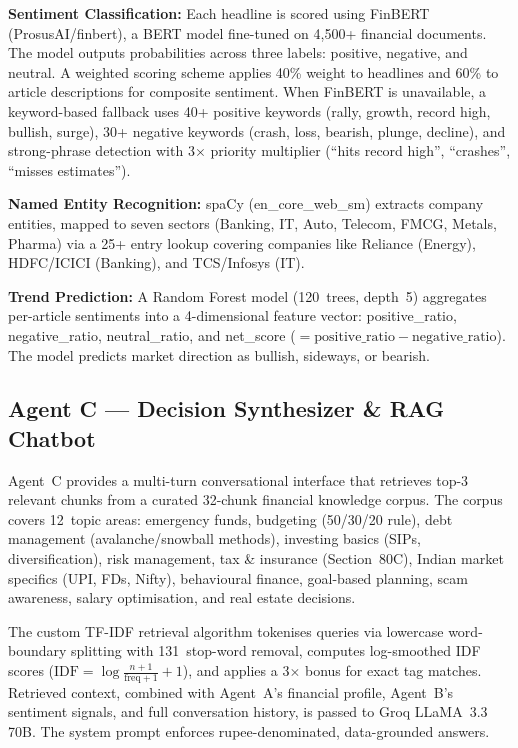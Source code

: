 \documentclass[conference]{IEEEtran}
\begin{document}
\textbf{Sentiment Classification:} Each headline is scored using FinBERT (ProsusAI/finbert), a BERT model fine-tuned on 4,500+ financial documents. The model outputs probabilities across three labels: positive, negative, and neutral. A weighted scoring scheme applies 40\% weight to headlines and 60\% to article descriptions for composite sentiment. When FinBERT is unavailable, a keyword-based fallback uses 40+ positive keywords (rally, growth, record high, bullish, surge), 30+ negative keywords (crash, loss, bearish, plunge, decline), and strong-phrase detection with 3$\times$ priority multiplier (``hits record high'', ``crashes'', ``misses estimates'').

\textbf{Named Entity Recognition:} spaCy (en\_core\_web\_sm) extracts company entities, mapped to seven sectors (Banking, IT, Auto, Telecom, FMCG, Metals, Pharma) via a 25+ entry lookup covering companies like Reliance (Energy), HDFC/ICICI (Banking), and TCS/Infosys (IT).

\textbf{Trend Prediction:} A Random Forest model (120~trees, depth~5) aggregates per-article sentiments into a 4-dimensional feature vector: positive\_ratio, negative\_ratio, neutral\_ratio, and net\_score ($= \text{positive\_ratio} - \text{negative\_ratio}$). The model predicts market direction as bullish, sideways, or bearish.

\subsection{Agent C --- Decision Synthesizer \& RAG Chatbot}

Agent~C provides a multi-turn conversational interface that retrieves top-3 relevant chunks from a curated 32-chunk financial knowledge corpus. The corpus covers 12~topic areas: emergency funds, budgeting (50/30/20 rule), debt management (avalanche/snowball methods), investing basics (SIPs, diversification), risk management, tax \& insurance (Section~80C), Indian market specifics (UPI, FDs, Nifty), behavioural finance, goal-based planning, scam awareness, salary optimisation, and real estate decisions.

The custom TF-IDF retrieval algorithm tokenises queries via lowercase word-boundary splitting with 131~stop-word removal, computes log-smoothed IDF scores ($\text{IDF} = \log\frac{n+1}{\text{freq}+1} + 1$), and applies a 3$\times$ bonus for exact tag matches. Retrieved context, combined with Agent~A's financial profile, Agent~B's sentiment signals, and full conversation history, is passed to Groq LLaMA~3.3 70B. The system prompt enforces rupee-denominated, data-grounded answers.
\end{document}
